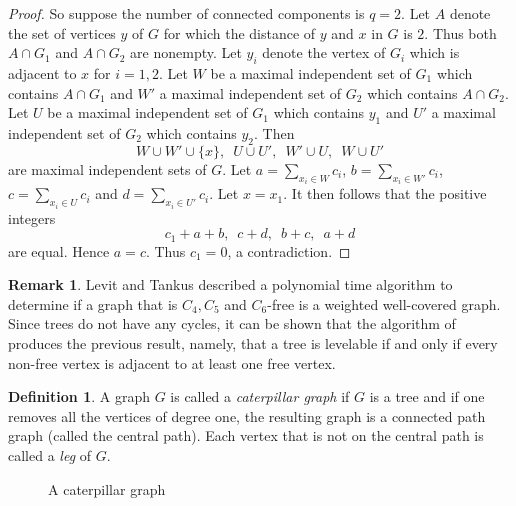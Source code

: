 \documentclass[12pt]{amsart}
\numberwithin{equation}{section}
\theoremstyle{definition}
\newtheorem{definition}[theorem]{Definition}
\newtheorem{remark}[theorem]{Remark}
\newcommand{\MC}[1]{{\color{red}[[\sf MC: #1]]}}
\newcounter{i} %
\begin{document}
\begin{proof}
So suppose the number of connected components is $q =2$.  Let  $A$ denote the set of vertices $y$ of $G$ for which the distance of $y$ and $x$ in $G$ is $2$.  Thus both $A\cap G_1$ and $A \cap G_2$ are nonempty.  Let $y_i$ denote the vertex of $G_i$ which is adjacent to $x$ for $i=1,2$.  Let $W$ be a maximal independent set of $G_1$ which contains $A\cap G_1$ and $W'$ a maximal independent set of $G_2$ which contains $A\cap G_2$.  Let $U$ be a maximal independent set of $G_1$ which contains $y_1$ and $U'$ a maximal independent set of $G_2$ which contains $y_2$.  Then 
\[
W\cup W' \cup \{x\}, \, \, \,  U \cup U', \, \, \, W' \cup U, \, \, \, W \cup U'
\]
are maximal independent sets of $G$.  Let $a = \sum_{x_i \in W} c_i$, $b = \sum_{x_i \in W'} c_i$, $c = \sum_{x_i \in U} c_i$ and $d = \sum_{x_i \in U'} c_i$. Let $x = x_1$.  It then follows %
that the positive integers 
\[c_1 + a + b,  \, \, \, c + d,  \, \, \, b + c,  \, \, \, a + d\]
are equal.  Hence $a =c$.  Thus $c_1=0$, a contradiction.
\end{proof}

\begin{remark}
    Levit and Tankus \cite{LT2015} described a polynomial time
    algorithm to determine if a graph that is $C_4, C_5$ and $C_6$-free
    is a weighted well-covered graph.  Since trees
    do not have any cycles, it can be shown
    that the algorithm of \cite{LT2015} produces the previous result,
    namely, that a tree is levelable if and only if every 
    non-free vertex is adjacent to at least one free vertex.
    \end{remark}


\begin{definition}
A graph $G$ is called a {\it caterpillar graph} if $G$ is a tree and if
    one removes all the vertices of degree one, the
    resulting graph is a connected path graph (called
    the central path).
    Each  vertex 
    that is 
    not on the central path is 
    called a
    {\it leg} of $G$. 
\end{definition}

\begin{figure}[h]
\centering
{}
\caption{A caterpillar graph} \label{caterpillar}
\end{figure}
\end{document}
